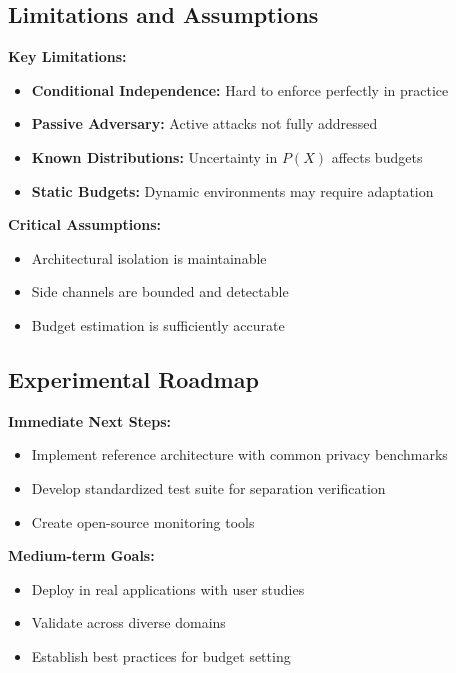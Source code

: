 \documentclass[11pt,a4paper]{article}
\theoremstyle{definition}
\begin{document}
\subsection{Limitations and Assumptions}

\textbf{Key Limitations:}

\begin{itemize}
    \item \textbf{Conditional Independence:} Hard to enforce perfectly in practice
    \item \textbf{Passive Adversary:} Active attacks not fully addressed
    \item \textbf{Known Distributions:} Uncertainty in $P(X)$ affects budgets
    \item \textbf{Static Budgets:} Dynamic environments may require adaptation
\end{itemize}

\textbf{Critical Assumptions:}

\begin{itemize}
    \item Architectural isolation is maintainable
    \item Side channels are bounded and detectable
    \item Budget estimation is sufficiently accurate
\end{itemize}

\subsection{Experimental Roadmap}

\textbf{Immediate Next Steps:}

\begin{itemize}
    \item Implement reference architecture with common privacy benchmarks
    \item Develop standardized test suite for separation verification
    \item Create open-source monitoring tools
\end{itemize}

\textbf{Medium-term Goals:}

\begin{itemize}
    \item Deploy in real applications with user studies
    \item Validate across diverse domains
    \item Establish best practices for budget setting
\end{itemize}
\end{document}
